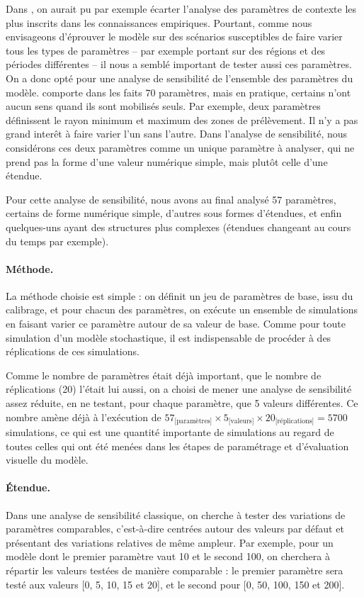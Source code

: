 Dans \simfeodal{}, on aurait pu par exemple écarter l'analyse des paramètres de contexte les plus inscrits dans les connaissances empiriques.
Pourtant, comme nous envisageons d'éprouver le modèle sur des scénarios susceptibles de faire varier tous les types de paramètres -- par exemple portant sur des régions et des périodes différentes -- il nous a semblé important de tester aussi ces paramètres.
On a donc opté pour une analyse de sensibilité de l'ensemble des paramètres du modèle.
\simfeodal{} comporte dans les faits 70 paramètres, mais en pratique, certains n'ont aucun sens quand ils sont mobilisés seuls.
Par exemple, deux paramètres définissent le rayon minimum et maximum des zones de prélèvement.
Il n'y a pas grand interêt à faire varier l'un sans l'autre.
Dans l'analyse de sensibilité, nous considérons ces deux paramètres comme un unique paramètre à analyser, qui ne prend pas la forme d'une valeur numérique simple, mais plutôt celle d'une étendue.

Pour cette analyse de sensibilité, nous avons au final analysé 57 \og paramètres\fg{}, certains de forme numérique simple, d'autres sous formes d'étendues, et enfin quelques-uns ayant des structures plus complexes (étendues changeant au cours du temps par exemple).

\paragraph{Méthode.}
La méthode choisie est simple : on définit un jeu de paramètres de base, issu du calibrage, et pour chacun des paramètres, on exécute un ensemble de simulations en faisant varier ce paramètre autour de sa valeur de base.
Comme pour toute simulation d'un modèle stochastique, il est indispensable de procéder à des réplications de ces simulations.

Comme le nombre de paramètres était déjà important, que le nombre de réplications (20) l'était lui aussi, on a choisi de mener une analyse de sensibilité assez réduite, en ne testant, pour chaque paramètre, que 5 valeurs différentes.
Ce nombre amène déjà à l'exécution de $57_{\text{[paramètres]}} \times 5_{\text{[valeurs]}} \times 20_{\text{[réplications]}} = 5700$ simulations, ce qui est une quantité importante de simulations au regard de toutes celles qui ont été menées dans les étapes de paramétrage et d'évaluation visuelle du modèle.

\paragraph{Étendue.}\label{par:etendue-parametres}
Dans une analyse de sensibilité classique, on cherche à tester des variations de paramètres comparables, c'est-à-dire centrées autour des valeurs par défaut et présentant des variations relatives de même ampleur.
Par exemple, pour un modèle dont le premier paramètre vaut 10 et le second 100, on cherchera à répartir les valeurs testées de manière comparable : 
le premier paramètre sera testé aux valeurs [0, 5, 10, 15 et 20], et le second pour [0, 50, 100, 150 et 200].

